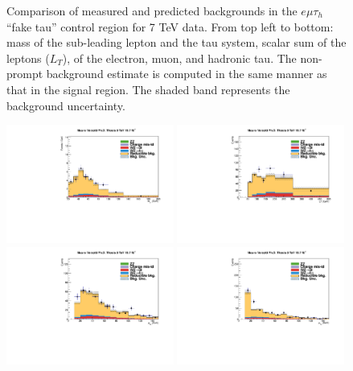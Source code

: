 \begin{figure}
\begin{center}
  \caption{Comparison of measured and predicted backgrounds in the $e\mu\tau_h$ ``fake tau'' control region for 7 TeV data.
  From top left to bottom: mass of the sub-leading lepton and the tau system, scalar sum of the leptons \pT ($L_T$), \pT of the electron, muon, and hadronic tau.
  The non-prompt background estimate is computed in the same manner as that in the signal region.
  The shaded band represents the background uncertainty.
  }
  \label{fig:LLT_emt_f3_control_7TeV}
\end{center}
\end{figure}

\begin{figure}
\begin{center}
  \includegraphics[width=0.49\textwidth]{4_Analisys/pics/8TeV/plots/emt/f3/Full/final-f3-subMass-Full.pdf}
  \includegraphics[width=0.49\textwidth]{4_Analisys/pics/8TeV/plots/emt/f3/final-f3-LT.pdf}\\
  \includegraphics[width=0.49\textwidth]{4_Analisys/pics/8TeV/plots/emt/f3/Full/final-f3-ePt-Full.pdf}
  \includegraphics[width=0.49\textwidth]{4_Analisys/pics/8TeV/plots/emt/f3/Full/final-f3-mPt-Full.pdf}\\

\end{center}
\end{figure}

